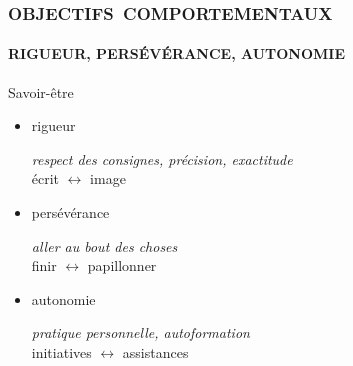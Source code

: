 \begin{frame}
\frametitle{\mbox{\uppercase{Objectifs comportementaux}}}
\framesubtitle{\uppercase{Rigueur, persévérance, autonomie}}
\begin{block}{Savoir-être}
	\begin{itemize}
	\item \alert{rigueur}
	
		\mbox{}\hfill {\em respect des consignes, précision,
		exactitude}\\
		\mbox{}\hfill écrit $\leftrightarrow$ image

	\item \alert{persévérance}
	
		\mbox{}\hfill {\em aller au bout des choses}\\
		\mbox{}\hfill finir $\leftrightarrow$  papillonner

	\item \alert{autonomie}
	
		\mbox{}\hfill {\em pratique personnelle, autoformation}\\
		\mbox{}\hfill initiatives $\leftrightarrow$ assistances
	\end{itemize}
\end{block}

\end{frame}
